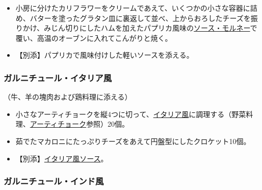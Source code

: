 \begin{recette}
\begin{itemize}
\item
  小房に分けたカリフラワーをクリームであえて、いくつかの小さな容器に詰め、バターを塗ったグラタン皿に裏返して並べ、上からおろしたチーズを振りかけ、みじん切りにしたハムを加えたパプリカ風味の\protect\hyperlink{sauce-mornay}{ソース・モルネー}で覆い、高温のオーブンに入れてこんがりと焼く。
\item
  【別添】パプリカで風味付けした軽いソースを添える。
\end{itemize}

\atoaki{}

\hypertarget{garniture-a-l-italienne}{%
\subsubsection{ガルニチュール・イタリア風}\label{garniture-a-l-italienne}}



（牛、羊の塊肉および鶏料理に添える）

\begin{itemize}
\item
  小さなアーティチョークを縦4つに切って、\protect\hyperlink{quartiers-d-artichauts-a-l-italienne}{イタリア風}に調理する（野菜料理、\protect\hyperlink{artichauts}{アーティチョーク}参照）20個。
\item
  茹でたマカロニにたっぷりチーズをあえて円盤型にしたクロケット10個。
\item
  【別添】\protect\hyperlink{sauce-italienne}{イタリア風ソース}。
\end{itemize}

\atoaki{}

\hypertarget{garniture-a-l-indienne}{%
\subsubsection{ガルニチュール・インド風}\label{garniture-a-l-indienne}}




\end{recette}
